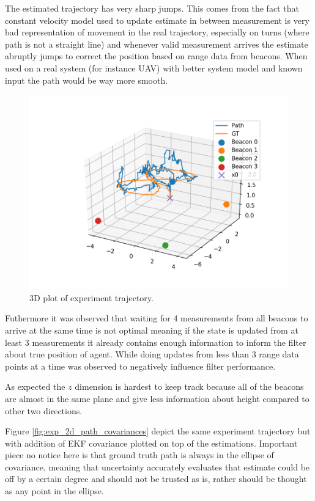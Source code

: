 The estimated trajectory has very sharp jumps. This comes from the fact that constant velocity model used to update estimate in between measurement is very bad representation of movement in the real trajectory, especially on turns (where path is not a straight line) and whenever valid measurement arrives the estimate abruptly jumps to correct the position based on range data from beacons. When used on a real system (for instance UAV) with better system model and known input the path would be way more smooth.
\begin{figure}[H]
    \centering
    \includegraphics[width=\linewidth]{figures/3d_path.png}
    \caption{3D plot of experiment trajectory.}
    \label{fig:exp_3D_path}
\end{figure}

Futhermore it was observed that waiting for 4 measurements from all beacons to arrive at the same time is not optimal meaning if the state is updated from at least 3 measurements it already contains enough information to inform the filter about true position of agent. While doing updates from less than 3 range data points at a time was observed to negatively influence filter performance.

As expected the $z$ dimension is hardest to keep track because all of the beacons are almost in the same plane and give less information about height compared to other two directions.

Figure \ref{fig:exp_2d_path_covariances} depict the same experiment trajectory but with addition of EKF covariance plotted on top of the estimations. Important piece no notice here is that ground truth path is always in the ellipse of covariance, meaning that uncertainty accurately evaluates that estimate could be off by a certain degree and should not be trusted as is, rather should be thought as any point in the ellipse.

